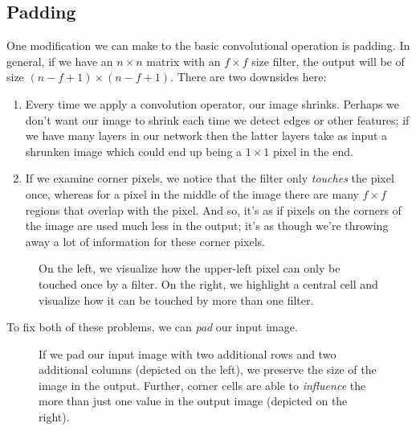 \documentclass[12pt]{article}
\begin{document}
\subsection{Padding} One modification we can make to the basic convolutional operation is padding. In general, if we have
an $n \times n$ matrix with an $f \times f$ size filter, the output will be of size $(n-f+1) \times (n-f+1)$. There are two downsides
here:
\begin{enumerate} \item Every time we apply a convolution operator, our image shrinks. Perhaps we don't want our image to shrink each time
  we detect edges or other features; if we have many layers in our network then the latter layers take as input
  a shrunken image which could end up being a $1 \times 1$ pixel in the end.
\item If we examine corner pixels, we notice that the filter only \emph{touches} the pixel once, whereas for a pixel
in the middle of the image there are many $f \times f$ regions that overlap with the pixel. And so, it's as if pixels on
the corners of the image are used much less in the output; it's as though we're throwing away a lot of information
for these corner pixels. \end{enumerate}

\begin{figure}[h]   \centering
  \caption{\footnotesize On the left, we visualize how the upper-left pixel can only be touched once by a filter. On the right,
    we highlight a central cell and visualize how it can be touched by more than one filter.} \end{figure}

To fix both of these problems, we can \emph{pad} our input image.
\begin{figure}   \centering
  \caption{\footnotesize If we pad our input image with two additional rows and two additional columns (depicted on the left), 
    we preserve the size of the image
    in the output. Further, corner cells are able to \emph{influence} the more than just one value in the output image 
    (depicted on the right).} \end{figure}
\end{document}
